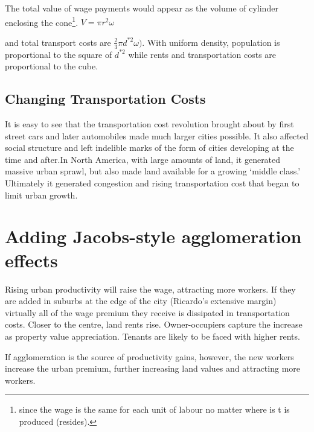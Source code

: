 The total value of wage payments would appear as the volume of cylinder enclosing the cone\footnote{since the wage is the same for each unit of labour no matter where is t is produced (resides).}.  
$V=\pi r^2 \omega$


 \vspace{1cm}



 \vspace{1cm}
and total transport costs are 
$\frac{2}{3}\pi  d^{*2} \omega).$
With uniform density, population is proportional to the square of  $d^{*2}$ while rents and  transportation costs are proportional to the cube. 

\subsection {Changing Transportation Costs}



 It is easy to see that the transportation cost revolution brought about by first street cars and later automobiles made much larger cities possible.  It also affected social structure and left indelible marks of the form of cities developing at the time and after.In North America, with large amounts of land, it generated massive urban sprawl, but also made land available for a growing `middle class.' Ultimately it generated congestion and rising transportation cost that began to limit urban growth. 

\section{Adding Jacobs-style agglomeration effects}
Rising urban productivity will raise the wage, attracting more workers. If they are added in suburbs at the edge of the city (Ricardo's extensive margin) virtually all of the wage premium they receive is dissipated in transportation costs. Closer to the centre,  land rents rise. Owner-occupiers capture the increase as property value appreciation. Tenants are likely to be faced with higher rents.      

If agglomeration is the source of productivity gains, however, the new workers increase the urban premium, further increasing land values and attracting more workers. 
